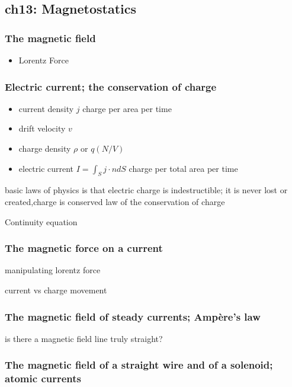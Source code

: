 \subsection{ch13: Magnetostatics}

\subsubsection{The magnetic field}
\begin{itemize}
	\item Lorentz Force
\end{itemize}


\subsubsection{Electric current; the conservation of charge}




\begin{itemize}
	\item current density $j$ charge per area per time
	\item drift velocity $v$
	\item charge density $\rho$ or $q(N/V)$
	\item electric current $I = \int_{S} j \cdot n dS$ charge per total area per time
\end{itemize}
basic laws of physics is that electric charge is indestructible; it is never lost or created,charge is conserved
law of the conservation of charge

Continuity equation


\subsubsection{The magnetic force on a current}

manipulating lorentz force 

current vs charge movement






\subsubsection{The magnetic field of steady currents; Ampère’s law}

is there a magnetic field line truly straight?




\subsubsection{The magnetic field of a straight wire and of a solenoid; atomic currents}
